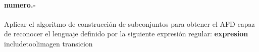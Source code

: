 

\paragraph{{numero}.-}\label{p{numero}}
Aplicar el algoritmo de construcción de subconjuntos para obtener el AFD capaz de reconocer el lenguaje definido por la siguiente expresión regular: \textbf{{expresion}} \\
{includetool}{{imagen}}
{transicion}